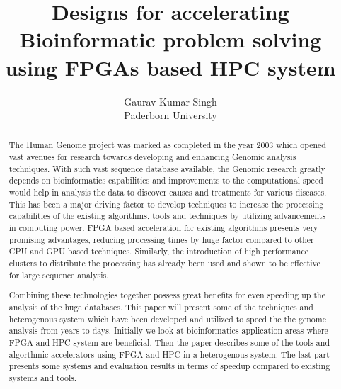 \documentclass[12pt,twoside]{article}
\newcommand{\participant}{Gaurav Kumar Singh}
\newcommand{\affiliation}{Paderborn University}
\newcommand{\topic}{Designs for accelerating Bioinformatic problem solving using FPGAs based HPC system}
\begin{document}
\title{\topic}
\author{\Large{\participant}\\ \affiliation \\ {\small \emailaddress}}
\date{}
\maketitle
\thispagestyle{empty}


\begin{abstract}

 The Human Genome project was marked as completed in the year 2003 which opened vast avenues 
 for research towards developing and enhancing Genomic analysis techniques. With such vast sequence
 database available, the Genomic research greatly depends on bioinformatics capabilities and improvements
 to the computational speed would help in analysis the data to discover causes and treatments for various
 diseases. This has been a major driving factor to develop techniques to increase the  processing
 capabilities of the  existing algorithms, tools and techniques by utilizing advancements in computing power.
 FPGA based acceleration for existing algorithms presents very promising advantages, reducing processing times
 by huge factor compared to other CPU and GPU based techniques. Similarly, the introduction of high performance
 clusters to distribute the processing has already been used and shown to be effective for large sequence analysis.

 Combining these technologies together possess great benefits for even speeding up the analysis of the huge databases.
 This paper will present some of the techniques and heterogenous system which have been developed and utilized to
 speed the the genome analysis from years to days. Initially we look at bioinformatics application areas where
 FPGA and HPC system are beneficial. Then the paper describes some of the tools and algorthmic accelerators
 using FPGA and HPC in a heterogenous system. The last part presents some systems and evaluation
 results in terms of speedup compared to existing systems and tools.

\end{abstract}

\end{document}
